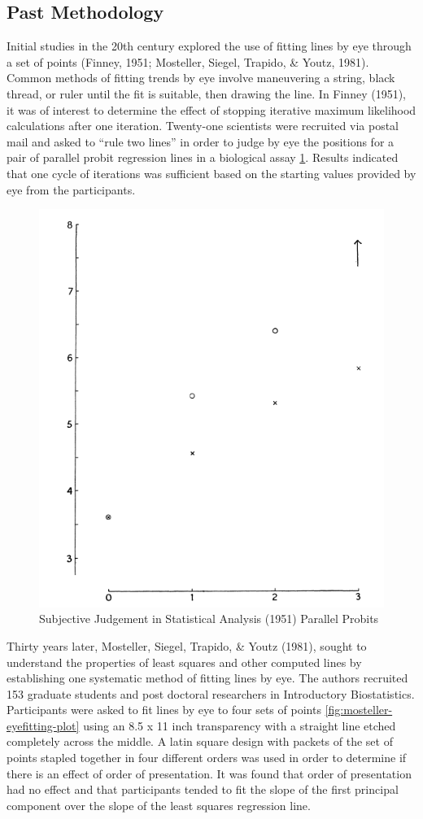 \documentclass[print]{nuthesis}
\begin{document}
\hypertarget{past-methodology}{%
\subsection{Past Methodology}\label{past-methodology}}

Initial studies in the 20th century explored the use of fitting lines by eye through a set of points (Finney, 1951; Mosteller, Siegel, Trapido, \& Youtz, 1981).
Common methods of fitting trends by eye involve maneuvering a string, black thread, or ruler until the fit is suitable, then drawing the line.
In Finney (1951), it was of interest to determine the effect of stopping iterative maximum likelihood calculations after one iteration. Twenty-one scientists were recruited via postal mail and asked to ``rule two lines'' in order to judge by eye the positions for a pair of parallel probit regression lines in a biological assay \cref{fig:subjective-judgement}.
Results indicated that one cycle of iterations was sufficient based on the starting values provided by eye from the participants.

\begin{figure}[tbp]

{\centering \includegraphics[width=0.5\linewidth,]{images/subjective-judgement-plot} 

}

\caption{Subjective Judgement in Statistical Analysis (1951) Parallel Probits}\label{fig:subjective-judgement}
\end{figure}

Thirty years later, Mosteller, Siegel, Trapido, \& Youtz (1981), sought to understand the properties of least squares and other computed lines by establishing one systematic method of fitting lines by eye.
The authors recruited 153 graduate students and post doctoral researchers in Introductory Biostatistics.
Participants were asked to fit lines by eye to four sets of points \cref{fig:mosteller-eyefitting-plot} using an 8.5 x 11 inch transparency with a straight line etched completely across the middle.
A latin square design with packets of the set of points stapled together in four different orders was used in order to determine if there is an effect of order of presentation.
It was found that order of presentation had no effect and that participants tended to fit the slope of the first principal component over the slope of the least squares regression line.
\end{document}
